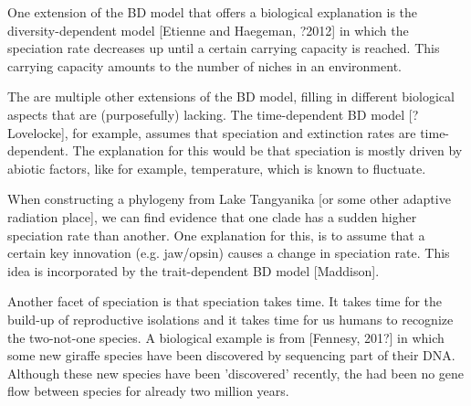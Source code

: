 One extension of the BD model that offers a biological explanation is the
diversity-dependent model [Etienne and Haegeman, ?2012] in which the
speciation rate decreases up until a certain carrying capacity is reached.
This carrying capacity amounts to the number of niches in an environment.

%
%
%
%
%

The are multiple other extensions of the BD model, filling in different
biological aspects that are (purposefully) lacking. The time-dependent BD 
model [?Lovelocke], for example, assumes that speciation and extinction 
rates are time-dependent. The explanation for this would be that speciation
is mostly driven by abiotic factors, like for example, temperature,
which is known to fluctuate.


When constructing a phylogeny from Lake Tangyanika [or some
other adaptive radiation place], we can find evidence that
one clade has a sudden higher speciation rate than another.
One explanation for this, is to assume that a certain key
innovation (e.g. jaw/opsin) causes a change in speciation
rate. This idea is incorporated by the trait-dependent 
BD model [Maddison].

%
%
%

Another facet of speciation is that speciation takes time. It
takes time for the build-up of reproductive isolations and it
takes time for us humans to recognize the two-not-one species.
A biological example is from [Fennesy, 201?] in which
some new giraffe species have been discovered by sequencing
part of their DNA. Although these new species have been
'discovered' recently, the had been no gene flow between species
for already two million years.

